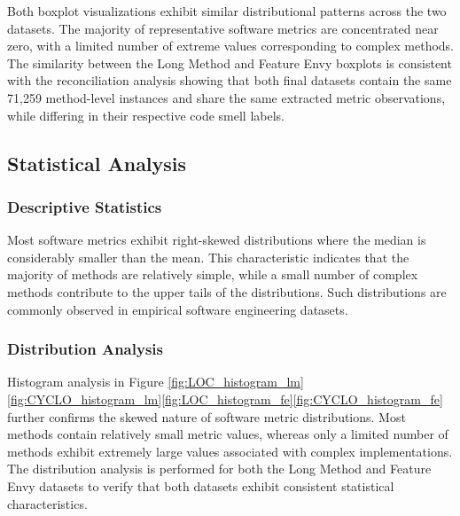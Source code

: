 \documentclass[]{einformatica}
\begin{document}
Both boxplot visualizations exhibit similar distributional patterns across the two datasets. The majority of representative software metrics are concentrated near zero, with a limited number of extreme values corresponding to complex methods. The similarity between the Long Method and Feature Envy boxplots is consistent with the reconciliation analysis showing that both final datasets contain the same 71,259 method-level instances and share the same extracted metric observations, while differing in their respective code smell labels.

\subsection{Statistical Analysis}
\subsubsection{Descriptive Statistics}

Most software metrics exhibit right-skewed distributions where the median is considerably smaller than the mean. This characteristic indicates that the majority of methods are relatively simple, while a small number of complex methods contribute to the upper tails of the distributions. Such distributions are commonly observed in empirical software engineering datasets.

\subsubsection{Distribution Analysis}

Histogram analysis in Figure \ref{fig:LOC_histogram_lm}\ref{fig:CYCLO_histogram_lm}\ref{fig:LOC_histogram_fe}\ref{fig:CYCLO_histogram_fe} further confirms the skewed nature of software metric distributions. Most methods contain relatively small metric values, whereas only a limited number of methods exhibit extremely large values associated with complex implementations. The distribution analysis is performed for both the Long Method and Feature Envy datasets to verify that both datasets exhibit consistent statistical characteristics.
\end{document}
